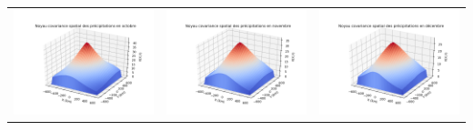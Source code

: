 \documentclass[a4paper,10pt]{article}
\begin{document}
\begin{tabular}{ccc}
		\includegraphics[scale=0.4]{images/kernel_precip_m10.png} & \includegraphics[scale=0.4]{images/kernel_precip_m11.png} & \includegraphics[scale=0.4]{images/kernel_precip_m12.png} \\
	\end{tabular} 
	
\end{document}
